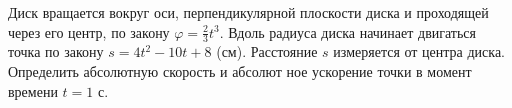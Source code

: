 Диск вращается вокруг оси, перпендикулярной плоскости диска и проходящей
через его центр, по закону $\varphi=\frac{2}{3}t^3$. Вдоль радиуса диска
начинает двигаться точка по закону $s=4t^2-10t+8$ (см). Расстояние 
$s$ измеряется от центра диска. Определить абсолютную скорость и абсолют
ное ускорение точки в момент времени $t=1$ с.
 
